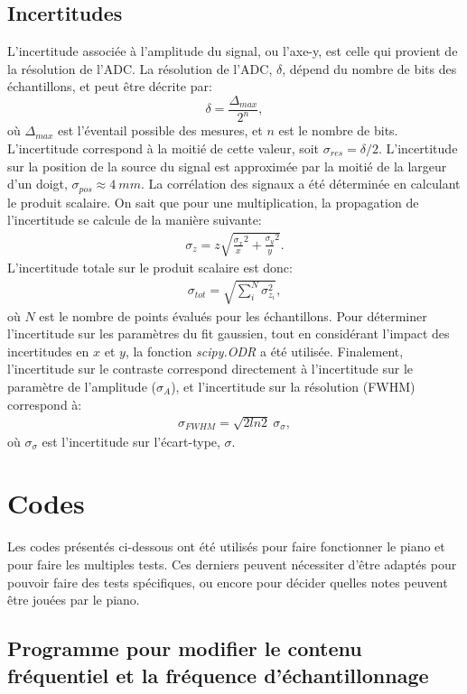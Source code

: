 ﻿\documentclass[11pt,letterpaper]{article}
\begin{document}
\subsection{Incertitudes}
L'incertitude associée à l'amplitude du signal, ou l'axe-y, est celle qui provient de la résolution 
de l'ADC. La résolution de l'ADC, $\delta$, dépend du nombre de bits des échantillons, et peut être décrite par:
\[\delta=\frac{\Delta_{max}}{2^{n}},\]
où $\Delta_{max}$ est l'éventail possible des mesures, et $n$ est le nombre de bits. L'incertitude correspond
à la moitié de cette valeur, soit $\sigma_{res}=\delta/2$. L'incertitude sur la position de la source du signal
est approximée par la moitié de la largeur d'un doigt, $\sigma_{pos}\approx4\ mm$. La corrélation des signaux a été déterminée
en calculant le produit scalaire. On sait que pour une multiplication, la propagation de l'incertitude se calcule de la
manière suivante:
\begin{align*}
  \sigma_{z}=z \sqrt{\frac{\sigma_x}{x}^2+\frac{\sigma_y}{y}^2}.
\end{align*}
L'incertitude totale sur le produit scalaire est donc:
\begin{align*}
  \sigma_{tot}=\sqrt{\sum_i^{N} \sigma_{z_i}^2},
\end{align*}
où $N$ est le nombre de points évalués pour les échantillons. Pour déterminer l'incertitude sur les
paramètres du fit gaussien, tout en considérant l'impact des incertitudes en $x$ et $y$, la fonction \textit{scipy.ODR}
a été utilisée. Finalement, l'incertitude sur le contraste correspond directement à l'incertitude sur le paramètre de
l'amplitude ($\sigma_{A}$), et l'incertitude sur la résolution (FWHM) correspond à:
\begin{align*}
  \sigma_{FWHM}=\sqrt{2ln2}\ \sigma_{\sigma},
\end{align*}
où $\sigma_{\sigma}$ est l'incertitude sur l'écart-type, $\sigma$.



\section{Codes}

Les codes présentés ci-dessous ont été utilisés pour faire fonctionner le piano et pour faire les
multiples tests. Ces derniers peuvent nécessiter d'être adaptés pour pouvoir faire des tests
spécifiques, ou encore pour décider quelles notes peuvent être jouées par le piano.

\subsection{Programme pour modifier le contenu fréquentiel et la fréquence d'échantillonnage}
\end{document}
